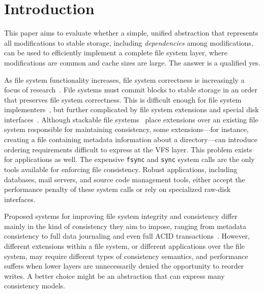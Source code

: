 
\section {Introduction}
\label{sec:intro}


This paper aims to evaluate whether a simple, unified abstraction that
represents all modifications to stable storage, including
\emph{dependencies} among modifications, can be used to efficiently
implement a complete file system layer, where modifications are common
and cache sizes are large.
%
The answer is a qualified yes.


As file system functionality increases, file system correctness is
 increasingly a focus of
 research~\cite{sivathanuetal05-logic,denehyetal05-journal-guided}.
%
File systems must commit blocks to stable storage in an order that
 preserves file system correctness.
%
This is difficult enough for file system
 implementers~\cite{tweedie98journaling,mckusick99soft}, but further
 complicated by file system extensions and special disk interfaces~\cite{soules03metadata,fast04versionfs,quinlan02venti,cornell04wayback,wright03ncryptfs,sivathanu03semantically-smart,sivathanu05database-aware}.
%
Although stackable file
 systems~\cite{zadok00fist,zadok99extending,heidemann94filesystem,rosenthal90evolving}
 place extensions over an existing file system responsible for maintaining
 consistency, some extensions---for instance, creating a file containing
 metadata information about a directory---can introduce ordering
 requirements difficult to express at the VFS layer.
%
This problem exists for applications as well.
%
The expensive \texttt{fsync} and \texttt{sync} system calls are the only
 tools available for enforcing file consistency.
%
Robust applications, including databases, mail servers, and source code
 management tools, either accept the performance penalty of these system
 calls or rely on specialized raw-disk interfaces.


Proposed systems for improving file system integrity and consistency differ
 mainly in the kind of consistency they aim to impose, ranging from
 metadata consistency to full data journaling
 and even full ACID
 transactions~\cite{gal05transactional,liskov04transactional}.
%
However, different extensions within a file system, or different
 applications over the file system, may require different types of
 consistency semantics, and performance suffers when lower layers are
 unnecessarily denied the opportunity to reorder
 writes.
%
A better choice might be an abstraction that can express many consistency
 models.



